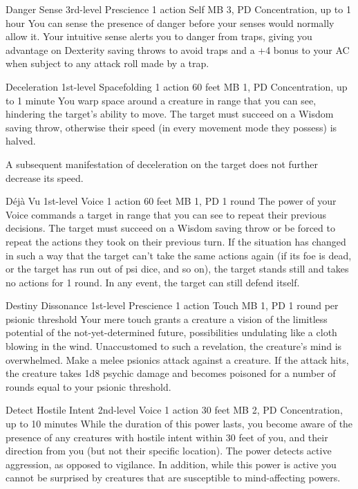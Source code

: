 \DndPowerHeader%
  {Danger Sense}
  {3rd-level Prescience}
  {1 action}
  {Self}
  {MB 3, PD \lvlthree}
  {Concentration, up to 1 hour}
  You can sense the presence of danger
  before your senses would normally allow it.
  Your intuitive sense alerts you to danger from traps,
  giving you advantage on Dexterity saving throws to avoid traps
  and a +4 bonus to your AC when subject to any attack roll
  made by a trap.

\DndPowerHeader%
  {Deceleration}
  {1st-level Spacefolding}
  {1 action}
  {60 feet}
  {MB 1, PD \lvlone}
  {Concentration, up to 1 minute}
You warp space around a creature in range that you can see,
hindering the target's ability to move.
The target must succeed on a Wisdom saving throw,
otherwise their speed
(in every movement mode they possess) is halved.

A subsequent manifestation of deceleration on the target
does not further decrease its speed.

\DndPowerHeader%
  {Déjà Vu}
  {1st-level Voice}
  {1 action}
  {60 feet}
  {MB 1, PD \lvlone}
  {1 round}
The power of your Voice commands a target in range
that you can see to repeat their previous decisions.
The target must succeed on a Wisdom saving throw
or be forced to repeat the actions they took on their previous turn.
If the situation has changed in such a way that the target
can't take the same actions again
(if its foe is dead, or the target has run out of psi dice, and so on),
the target stands still and takes no actions for 1 round.
In any event, the target can still defend itself.

\DndPowerHeader%
  {Destiny Dissonance}
  {1st-level Prescience}
  {1 action}
  {Touch}
  {MB 1, PD \lvlone}
  {1 round per psionic threshold}
  Your mere touch grants a creature
  a vision of the limitless potential
  of the not-yet-determined future,
  possibilities undulating like a cloth blowing in the wind.
  Unaccustomed to such a revelation,
  the creature's mind is overwhelmed.
  Make a melee psionics attack against a creature.
  If the attack hits,
  the creature takes 1d8 psychic damage
  and becomes poisoned for a number of rounds
  equal to your psionic threshold.

\DndPowerHeader%
  {Detect Hostile Intent}
  {2nd-level Voice}
  {1 action}
  {30 feet}
  {MB 2, PD \lvltwo}
  {Concentration, up to 10 minutes}
  While the duration of this power lasts,
  you become aware of the presence of any creatures with hostile intent
  within 30 feet of you,
  and their direction from you
  (but not their specific location).
  The power detects active aggression,
  as opposed to vigilance.
  In addition, while this power is active you cannot be surprised
  by creatures that are susceptible to mind-affecting powers.

